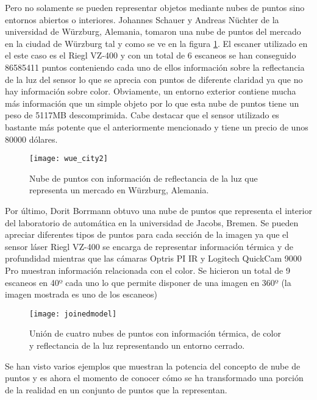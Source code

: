 Pero no solamente se pueden representar objetos mediante nubes de puntos sino entornos abiertos o interiores. Johannes Schauer y Andreas Nüchter de la universidad de Würzburg, Alemania, tomaron una nube de puntos\cite{pcd_exteriores} del mercado en la ciudad de Würzburg tal y como se ve en la figura \ref{fig:wue_city}.
El escaner utilizado en el este caso es el Riegl VZ-400\cite{escaner_riegl} y con un total de 6 escaneos se han conseguido 86585411 puntos conteniendo cada uno de ellos información sobre la reflectancia de la luz del sensor lo que se aprecia con puntos de diferente claridad ya que no hay información sobre color. Obviamente, un entorno exterior contiene mucha más información que un simple objeto por lo que esta nube de puntos tiene un peso de 5117MB descomprimida. Cabe destacar que el sensor utilizado es bastante más potente que el anteriormente mencionado y tiene un precio de unos 80000 dólares.



\begin{figure}
\centering
\texttt{[image: wue\_city2]}
\caption{Nube de puntos con información de reflectancia de la luz que representa un mercado en Würzburg, Alemania.}\label{fig:wue_city}
\end{figure}

Por último, Dorit Borrmann obtuvo una nube de puntos\cite{pcd_exteriores} que representa el interior del laboratorio de automática en la universidad de Jacobs, Bremen. Se pueden apreciar diferentes tipos de puntos para cada sección de la imagen ya que el sensor láser Riegl VZ-400 se encarga de representar información térmica y de profundidad mientras que las cámaras Optris PI IR y Logitech QuickCam 9000 Pro muestran información relacionada con el color. Se hicieron un total de 9 escaneos en 40º cada uno lo que permite disponer de una imagen en 360º (la imagen mostrada es uno de los escaneos)

\begin{figure}
\centering
\texttt{[image: joinedmodel]}
\caption{Unión de cuatro nubes de puntos con información térmica, de color y reflectancia de la luz representando un entorno cerrado.}\label{fig:joined_model}
\end{figure}


Se han visto varios ejemplos que muestran la potencia del concepto de nube de puntos y es ahora el momento de conocer cómo se ha transformado una porción de la realidad en un conjunto de puntos que la representan.


